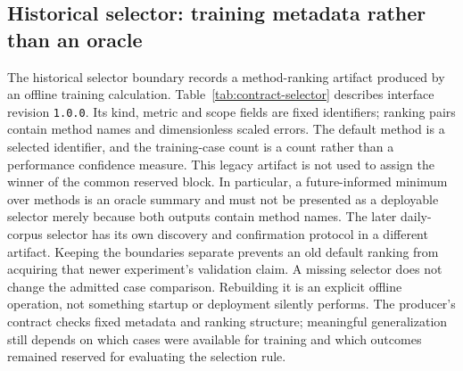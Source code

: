 \subsection{Historical selector: training metadata rather than an oracle}
\label{sec:contract-selector}
The historical selector boundary records a method-ranking artifact produced by an offline training calculation. Table~\ref{tab:contract-selector} describes interface revision \texttt{1.0.0}. Its kind, metric and scope fields are fixed identifiers; ranking pairs contain method names and dimensionless scaled errors. The default method is a selected identifier, and the training-case count is a count rather than a performance confidence measure. This legacy artifact is not used to assign the winner of the common reserved block. In particular, a future-informed minimum over methods is an oracle summary and must not be presented as a deployable selector merely because both outputs contain method names. The later daily-corpus selector has its own discovery and confirmation protocol in a different artifact. Keeping the boundaries separate prevents an old default ranking from acquiring that newer experiment's validation claim. A missing selector does not change the admitted case comparison. Rebuilding it is an explicit offline operation, not something startup or deployment silently performs. The producer's contract checks fixed metadata and ranking structure; meaningful generalization still depends on which cases were available for training and which outcomes remained reserved for evaluating the selection rule.


